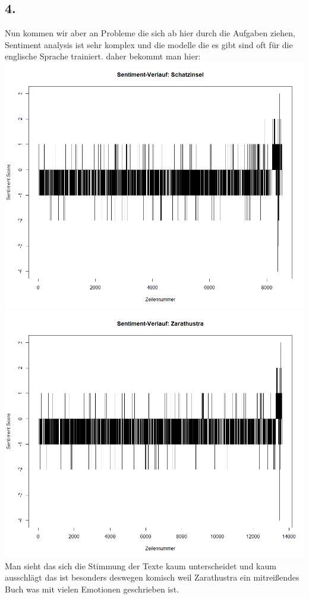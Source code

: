 \documentclass{scrartcl}
\begin{document}
\subsection*{4.}
Nun kommen wir aber an Probleme die sich ab hier durch die Aufgaben ziehen, Sentiment analysis ist sehr komplex und die modelle die es gibt sind oft für die englische Sprache trainiert. daher bekommt man hier:\\
\includegraphics*[scale=0.5]{SentimentSchatzinsel.png}\\
\includegraphics*[scale=0.5]{sentimentZarathustra.png}\\
Man sieht das sich die Stimmung der Texte kaum unterscheidet und kaum ausschlägt das ist besonders deswegen komisch weil Zarathustra ein mitreißendes Buch was mit vielen Emotionen geschrieben ist.
\end{document}
